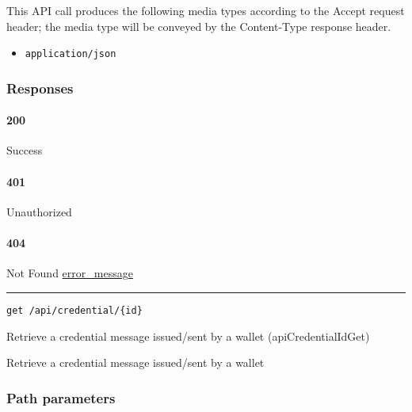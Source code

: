 This API call produces the following media types according to the
{Accept} request header; the media type will be conveyed by the
{Content-Type} response header.

\begin{itemize}
\tightlist
\item
  \texttt{application/json}
\end{itemize}

\hypertarget{responses-57}{%
\subsubsection{Responses}\label{responses-57}}

\hypertarget{section-188}{%
\paragraph{200}\label{section-188}}

Success

\hypertarget{section-189}{%
\paragraph{401}\label{section-189}}

Unauthorized \protect\hyperlink{}{}

\hypertarget{section-190}{%
\paragraph{404}\label{section-190}}

Not Found \protect\hyperlink{error_message}{error\_message}

\begin{center}\rule{0.5\linewidth}{\linethickness}\end{center}

\protect\hypertarget{apiCredentialIdGet}{}{}

\begin{verbatim}
get /api/credential/{id}
\end{verbatim}

Retrieve a credential message issued/sent by a wallet
({apiCredentialIdGet})

Retrieve a credential message issued/sent by a wallet

\hypertarget{path-parameters-29}{%
\subsubsection{Path parameters}\label{path-parameters-29}}

